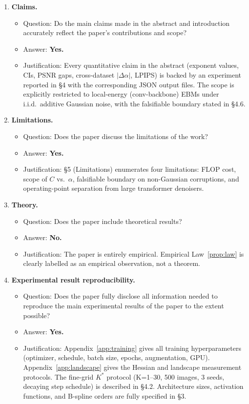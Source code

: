 \documentclass{article}
\begin{document}
\begin{enumerate}

\item \textbf{Claims.}
\begin{itemize}
  \item Question: Do the main claims made in the abstract and introduction accurately reflect the paper's contributions and scope?
  \item Answer: \textbf{Yes.}
  \item Justification: Every quantitative claim in the abstract (exponent values, CIs, PSNR gaps, cross-dataset $|\Delta\alpha|$, LPIPS) is backed by an experiment reported in §4 with the corresponding JSON output files. The scope is explicitly restricted to local-energy (conv-backbone) EBMs under i.i.d.\ additive Gaussian noise, with the falsifiable boundary stated in §4.6.
\end{itemize}

\item \textbf{Limitations.}
\begin{itemize}
  \item Question: Does the paper discuss the limitations of the work?
  \item Answer: \textbf{Yes.}
  \item Justification: §5 (Limitations) enumerates four limitations: FLOP cost, scope of $C$ vs.\ $\alpha$, falsifiable boundary on non-Gaussian corruptions, and operating-point separation from large transformer denoisers.
\end{itemize}

\item \textbf{Theory.}
\begin{itemize}
  \item Question: Does the paper include theoretical results?
  \item Answer: \textbf{No.}
  \item Justification: The paper is entirely empirical. Empirical Law~\ref{prop:law} is clearly labelled as an empirical observation, not a theorem.
\end{itemize}

\item \textbf{Experimental result reproducibility.}
\begin{itemize}
  \item Question: Does the paper fully disclose all information needed to reproduce the main experimental results of the paper to the extent possible?
  \item Answer: \textbf{Yes.}
  \item Justification: Appendix~\ref{app:training} gives all training hyperparameters (optimizer, schedule, batch size, epochs, augmentation, GPU). Appendix~\ref{app:landscape} gives the Hessian and landscape measurement protocols. The fine-grid $K^*$ protocol (K=1--30, 500 images, 3 seeds, decaying step schedule) is described in §4.2. Architecture sizes, activation functions, and B-spline orders are fully specified in §3.
\end{itemize}


\end{enumerate}
\end{document}
